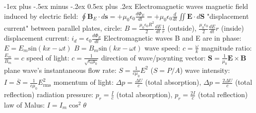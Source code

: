 \documentclass[10pt,landscape]{article}
\makeatletter
\renewcommand{\subsection}{\@startsection{subsection}{2}{0mm}%
                                {-1ex plus -.5ex minus -.2ex}%
                                {0.5ex plus .2ex}%
                                {\normalfont\normalsize\bfseries}}
\newcommand{\spc}{\hspace*{1em}}
\makeatother
\begin{document}
\begin{multicols*}{3}
\subsection{Electromagnetic waves}
magnetic field induced by electric field: $\oint \mathbf{B}_E\cdot d\mathbf{s}=+\mu _0\epsilon _0\frac{d\Phi _E}{dt}=+\mu _0\epsilon _0\frac{d}{dt}\iint\mathbf{E}\cdot d\mathbf{S}$
\newline
"displacement current" between parallel plates, circle: 
\newline
\spc $B=\frac{\mu _0\epsilon _0R^2}{2}\frac{dE}{dt}\frac{1}{r}$ (outside), $\frac{\mu _0\epsilon _0}{2}\frac{dE}{dt}r$ (inside)
\newline
displacement current: $i_d=\epsilon _0\frac{d\Phi _E}{dt}$
\newline \newline 
Electromagnetic waves
\newline
\spc B and E are in phase:
\newline
\spc\spc $E=E_m\mathrm{sin}(kx-\omega t)$
\newline
\spc\spc $B=B_m\mathrm{sin}(kx-\omega t)$
\newline
\spc wave speed: $c=\frac{\omega }{k}$
\newline
\spc magnitude ratio: $\frac{E_m}{B_m}=c$
\newline
\spc speed of light: $c=\frac{1}{\sqrt{\epsilon _0\mu _0}}$
\newline
\spc direction of wave/poynting vector: $\mathbf{S}=\frac{1}{\mu _0}\mathbf{E}\times \mathbf{B}$
\newline \newline
plane wave's instantaneous flow rate: $S=\frac{1}{c\mu _0}E^2$ ($S=P/A$)
\newline
wave intensity: $I=\overline{S}=\frac{1}{c\mu _0}E_{\textrm{rms}}^2$
\newline
momentum of light: 
\newline
\spc $\Delta p=\frac{\Delta U}{c}$ (total absorption), $\Delta p=\frac{2\Delta U}{c}$ (total reflection)
\newline
radiation pressure:
\newline
\spc $p_r=\frac{I}{c}$ (total absorption), $p_r=\frac{2I}{c}$ (total reflection)
\newline
law of Malus: $I=I_m \cos ^2\theta $


\end{multicols*}
\end{document}
